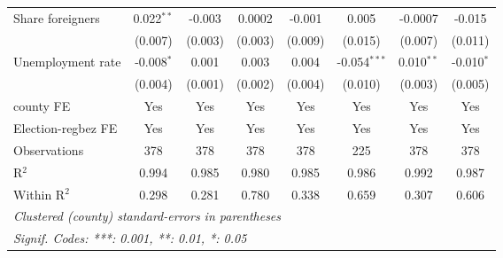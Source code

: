 \begin{table}[htbp]
\begin{tabular}{lccccccc}
      Share foreigners                                        & 0.022$^{**}$  & -0.003       & 0.0002         & -0.001        & 0.005          & -0.0007        & -0.015\\   
                                                              & (0.007)       & (0.003)      & (0.003)        & (0.009)       & (0.015)        & (0.007)        & (0.011)\\   
      Unemployment rate                                       & -0.008$^{*}$  & 0.001        & 0.003          & 0.004         & -0.054$^{***}$ & 0.010$^{**}$   & -0.010$^{*}$\\   
                                                              & (0.004)       & (0.001)      & (0.002)        & (0.004)       & (0.010)        & (0.003)        & (0.005)\\   
      county FE                                               & Yes           & Yes          & Yes            & Yes           & Yes            & Yes            & Yes\\  
      Election-regbez FE                                      & Yes           & Yes          & Yes            & Yes           & Yes            & Yes            & Yes\\  
      Observations                                            & 378           & 378          & 378            & 378           & 225            & 378            & 378\\  
      R$^2$                                                   & 0.994         & 0.985        & 0.980          & 0.985         & 0.986          & 0.992          & 0.987\\  
      Within R$^2$                                            & 0.298         & 0.281        & 0.780          & 0.338         & 0.659          & 0.307          & 0.606\\  
      \midrule \midrule
      \multicolumn{8}{l}{\emph{Clustered (county) standard-errors in parentheses}}\\
      \multicolumn{8}{l}{\emph{Signif. Codes: ***: 0.001, **: 0.01, *: 0.05}}\\
   \end{tabular}
\end{table}



